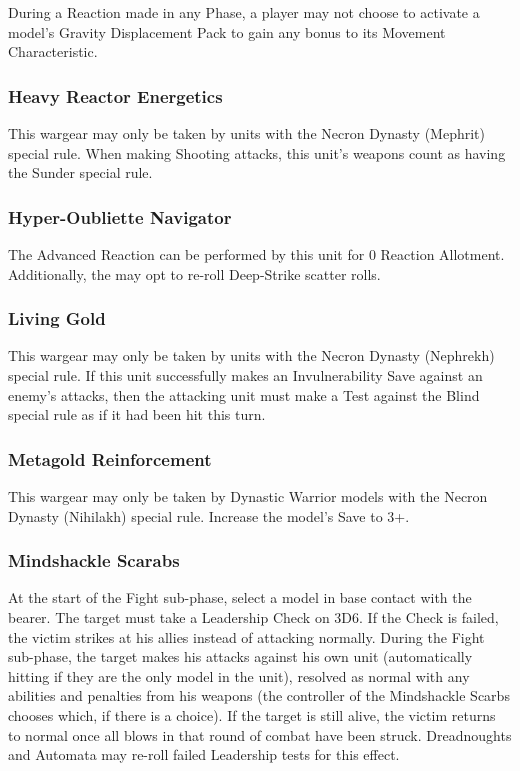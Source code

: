 During a Reaction made in any Phase, a player may not choose to activate a model’s Gravity Displacement Pack to gain any bonus to its Movement Characteristic.

\subsubsection{Heavy Reactor Energetics} \label{Heavy Reactor Energetics}

This wargear may only be taken by units with the Necron Dynasty (Mephrit) special rule. When making Shooting attacks, this unit's weapons count as having the Sunder special rule.

\subsubsection{Hyper-Oubliette Navigator} \label{Hyper-Oubliette Navigator}

The  Advanced Reaction can be performed by this unit for 0 Reaction Allotment. Additionally, the may opt to re-roll Deep-Strike scatter rolls.

\subsubsection{Living Gold} \label{Living Gold}

This wargear may only be taken by units with the Necron Dynasty (Nephrekh) special rule. If this unit successfully makes an Invulnerability Save against an enemy's attacks, then the attacking unit must make a Test against the Blind special rule as if it had been hit this turn.

\subsubsection{Metagold Reinforcement} \label{Metagold Reinforcement}

This wargear may only be taken by Dynastic Warrior models with the Necron Dynasty (Nihilakh) special rule. Increase the model's Save to 3+.

\subsubsection{Mindshackle Scarabs} \label{Mindshackle Scarabs}

At the start of the Fight sub-phase, select a model in base contact with the bearer. The target must take a Leadership Check on 3D6. If the Check is failed, the victim strikes at his allies instead of attacking normally. During the Fight sub-phase, the target makes his attacks against his own unit (automatically hitting if they are the only model in the unit), resolved as normal with any abilities and penalties from his weapons (the controller of the Mindshackle Scarbs chooses which, if there is a choice). If the target is still alive, the victim returns to normal once all blows in that round of combat have been struck. Dreadnoughts and Automata may re-roll failed Leadership tests for this effect.

